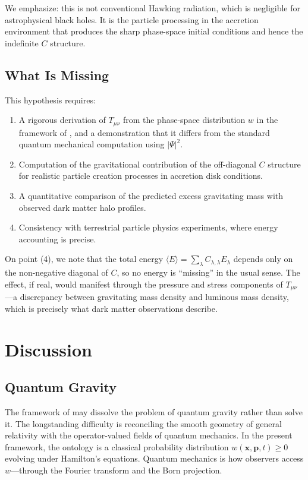 \documentclass[12pt]{article}
\begin{document}
We emphasize: this is not conventional Hawking radiation, which is negligible for astrophysical black holes.  It is the particle processing in the accretion environment that produces the sharp phase-space initial conditions and hence the indefinite $C$ structure.

\subsection{What Is Missing}

This hypothesis requires:
\begin{enumerate}
\item A rigorous derivation of $T_{\mu\nu}$ from the phase-space distribution $w$ in the framework of \cite{macevoy2025}, and a demonstration that it differs from the standard quantum mechanical computation using $|\Psi|^2$.
\item Computation of the gravitational contribution of the off-diagonal $C$ structure for realistic particle creation processes in accretion disk conditions.
\item A quantitative comparison of the predicted excess gravitating mass with observed dark matter halo profiles.
\item Consistency with terrestrial particle physics experiments, where energy accounting is precise.
\end{enumerate}

On point (4), we note that the total energy $\langle E \rangle = \sum_\lambda C_{\lambda,\lambda} E_\lambda$ depends only on the non-negative diagonal of $C$, so no energy is ``missing'' in the usual sense.  The effect, if real, would manifest through the pressure and stress components of $T_{\mu\nu}$---a discrepancy between gravitating mass density and luminous mass density, which is precisely what dark matter observations describe.

\section{Discussion}

\subsection{Quantum Gravity}

The framework of \cite{macevoy2025} may dissolve the problem of quantum gravity rather than solve it.  The longstanding difficulty is reconciling the smooth geometry of general relativity with the operator-valued fields of quantum mechanics.  In the present framework, the ontology is a classical probability distribution $w(\mathbf{x},\mathbf{p},t) \geq 0$ evolving under Hamilton's equations.  Quantum mechanics is how observers access $w$---through the Fourier transform and the Born projection.
\end{document}
